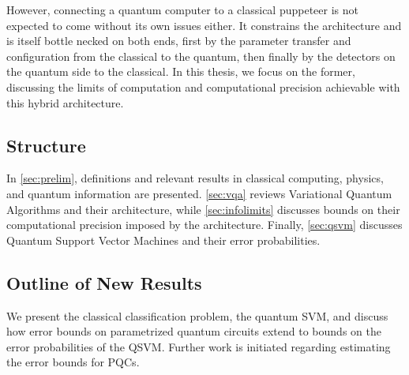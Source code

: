 However, connecting a quantum computer to a classical puppeteer is not expected
to come without its own issues either. It constrains the architecture and is
itself bottle necked on both ends, first by the parameter transfer and
configuration from the classical to the quantum, then finally by the detectors
on the quantum side to the classical. In this thesis, we focus on the former,
discussing the limits of computation and computational precision achievable with
this hybrid architecture.

\subsection{Structure}
In \autoref{sec:prelim}, definitions and relevant results in classical
computing, physics, and quantum information are presented.  \autoref{sec:vqa}
reviews Variational Quantum Algorithms and their architecture, while
\autoref{sec:infolimits} discusses bounds on their computational precision
imposed by the architecture. Finally, \autoref{sec:qsvm} discusses Quantum
Support Vector Machines and their error probabilities.

\subsection{Outline of New Results}
We present the classical classification problem, the quantum SVM, and discuss
how error bounds on parametrized quantum circuits extend to bounds on the error
probabilities of the QSVM. Further work is initiated regarding estimating the
error bounds for PQCs.

